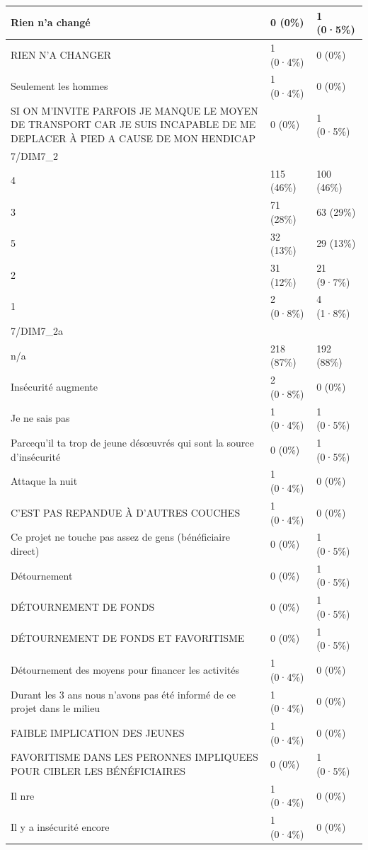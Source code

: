 \documentclass[
]{book}
\begin{document}
\begin{tabular}{l|l|l}
\hline
Rien n'a changé & 0 (0\%) & 1 (0·5\%)\\
\hline
RIEN N'A CHANGER & 1 (0·4\%) & 0 (0\%)\\
\hline
Seulement les hommes & 1 (0·4\%) & 0 (0\%)\\
\hline
SI ON M'INVITE PARFOIS JE MANQUE LE MOYEN DE TRANSPORT CAR JE SUIS INCAPABLE DE ME DEPLACER À PIED A CAUSE DE MON HENDICAP & 0 (0\%) & 1 (0·5\%)\\
\hline
7/DIM7\_2 &  & \\
\hline
4 & 115 (46\%) & 100 (46\%)\\
\hline
3 & 71 (28\%) & 63 (29\%)\\
\hline
5 & 32 (13\%) & 29 (13\%)\\
\hline
2 & 31 (12\%) & 21 (9·7\%)\\
\hline
1 & 2 (0·8\%) & 4 (1·8\%)\\
\hline
7/DIM7\_2a &  & \\
\hline
n/a & 218 (87\%) & 192 (88\%)\\
\hline
Insécurité augmente & 2 (0·8\%) & 0 (0\%)\\
\hline
Je ne sais pas & 1 (0·4\%) & 1 (0·5\%)\\
\hline
Parcequ'il ta trop de jeune désœuvrés qui sont la source d'insécurité & 0 (0\%) & 1 (0·5\%)\\
\hline
Attaque la nuit & 1 (0·4\%) & 0 (0\%)\\
\hline
C'EST PAS REPANDUE À D'AUTRES COUCHES & 1 (0·4\%) & 0 (0\%)\\
\hline
Ce projet ne touche pas assez de gens (bénéficiaire direct) & 0 (0\%) & 1 (0·5\%)\\
\hline
Détournement & 0 (0\%) & 1 (0·5\%)\\
\hline
DÉTOURNEMENT DE FONDS & 0 (0\%) & 1 (0·5\%)\\
\hline
DÉTOURNEMENT DE FONDS ET FAVORITISME & 0 (0\%) & 1 (0·5\%)\\
\hline
Détournement des moyens pour financer les activités & 1 (0·4\%) & 0 (0\%)\\
\hline
Durant les 3 ans nous n'avons pas été informé de ce projet dans le milieu & 1 (0·4\%) & 0 (0\%)\\
\hline
FAIBLE IMPLICATION DES JEUNES & 1 (0·4\%) & 0 (0\%)\\
\hline
FAVORITISME DANS LES PERONNES IMPLIQUEES POUR CIBLER LES BÉNÉFICIAIRES & 0 (0\%) & 1 (0·5\%)\\
\hline
Il nre & 1 (0·4\%) & 0 (0\%)\\
\hline
Il y a insécurité encore & 1 (0·4\%) & 0 (0\%)\\

\end{tabular}
\end{document}
